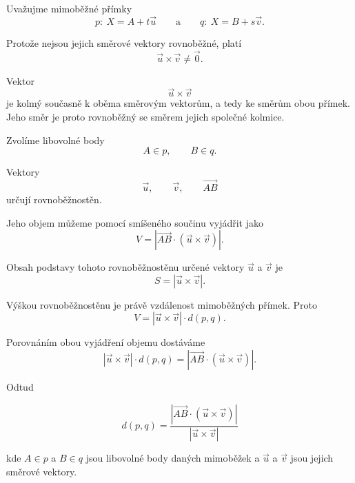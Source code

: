 Uvažujme mimoběžné přímky
\[
    p:\ X=A+t\vec{u}
    \qquad\text{a}\qquad
    q:\ X=B+s\vec{v}.
\]

Protože nejsou jejich směrové vektory rovnoběžné, platí
\[
    \vec{u}\times\vec{v}\neq\vec{0}.
\]

Vektor
\[
    \vec{u}\times\vec{v}
\]
je kolmý současně k oběma směrovým vektorům, a tedy ke směrům
obou přímek. Jeho směr je proto rovnoběžný se směrem jejich
společné kolmice.

Zvolíme libovolné body
\[
    A\in p,
    \qquad
    B\in q.
\]

Vektory
\[
    \vec{u},
    \qquad
    \vec{v},
    \qquad
    \overrightarrow{AB}
\]
určují rovnoběžnostěn.

Jeho objem můžeme pomocí smíšeného součinu vyjádřit jako
\[
    V
    =
    \left|
        \overrightarrow{AB}\cdot
        (\vec{u}\times\vec{v})
    \right|.
\]

Obsah podstavy tohoto rovnoběžnostěnu určené vektory
$\vec{u}$ a $\vec{v}$ je
\[
    S
    =
    |\vec{u}\times\vec{v}|.
\]

Výškou rovnoběžnostěnu je právě vzdálenost mimoběžných přímek.
Proto
\[
    V
    =
    |\vec{u}\times\vec{v}|\cdot d(p,q).
\]

Porovnáním obou vyjádření objemu dostáváme
\[
    |\vec{u}\times\vec{v}|\cdot d(p,q)
    =
    \left|
        \overrightarrow{AB}\cdot
        (\vec{u}\times\vec{v})
    \right|.
\]

Odtud

\begin{equation}
        d(p,q)
        =
        \frac{
            \left|
                \overrightarrow{AB}\cdot
                (\vec{u}\times\vec{v})
            \right|
        }{
            |\vec{u}\times\vec{v}|
        }
    \label{eq:Distance_skew_lines_space}
\end{equation}

kde $A\in p$ a $B\in q$ jsou libovolné body daných mimoběžek
a $\vec{u}$ a $\vec{v}$ jsou jejich směrové vektory.

